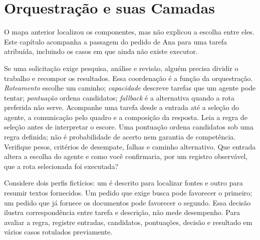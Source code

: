 \chapter{Orquestração e suas Camadas}

O mapa anterior localizou os componentes, mas não explicou a escolha entre eles. Este capítulo acompanha a passagem do pedido de Ana para uma tarefa atribuída, incluindo os casos em que ainda não existe executor.


\roteirodidatico
{Se uma solicitação exige pesquisa, análise e revisão, alguém precisa dividir o trabalho e recompor os resultados. Essa coordenação é a função da orquestração.}
{\emph{Roteamento} escolhe um caminho; \emph{capacidade} descreve tarefas que um agente pode tentar; \emph{pontuação} ordena candidatos; \emph{fallback} é a alternativa quando a rota preferida não serve.}
{Acompanhe uma tarefa desde a entrada até a seleção do agente, a comunicação pelo quadro e a composição da resposta. Leia a regra de seleção antes de interpretar o escore.}
{Uma pontuação ordena candidatos sob uma regra definida; não é probabilidade de acerto nem garantia de competência. Verifique pesos, critérios de desempate, falhas e caminho alternativo.}
{Que entrada altera a escolha do agente e como você confirmaria, por um registro observável, que a rota selecionada foi executada?}

{Considere dois perfis fictícios: um é descrito para localizar fontes e outro para resumir textos fornecidos. Um pedido que exige busca pode favorecer o primeiro; um pedido que já fornece os documentos pode favorecer o segundo. Essa decisão ilustra correspondência entre tarefa e descrição, não mede desempenho. Para avaliar a regra, registre entradas, candidatos, pontuações, decisão e resultado em vários casos rotulados previamente.}

